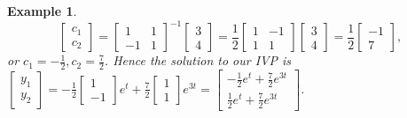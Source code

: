 \documentclass[10pt]{article}
\theoremstyle{plain}
\theoremstyle{box}
\newtheorem{example}{Example}
\begin{document}
\begin{example}
$$
\begin{bmatrix}c_1\\c_2\end{bmatrix} 
=
\begin{bmatrix}1 &1\\-1&1\end{bmatrix}^{-1}
\begin{bmatrix}3\\4\end{bmatrix} 
=
\frac{1}{2}
\begin{bmatrix}1 &-1\\1&1\end{bmatrix}
\begin{bmatrix}3\\4\end{bmatrix} 
=
\frac{1}{2}
\begin{bmatrix}-1 \\7\end{bmatrix}
,$$ or $c_1=-\frac12, c_2=\frac72$.  Hence the solution to our IVP is 
$ \begin{bmatrix}y_1\\y_2\end{bmatrix} 
= -\frac12\begin{bmatrix}1\\-1\end{bmatrix}e^t 
+ \frac72\begin{bmatrix}1\\1\end{bmatrix}e^{3t}
=
\begin{bmatrix}-\frac12e^t + \frac72e^{3t}\\\frac12e^t + \frac72e^{3t}\end{bmatrix}$.
\end{example}
\end{document}
